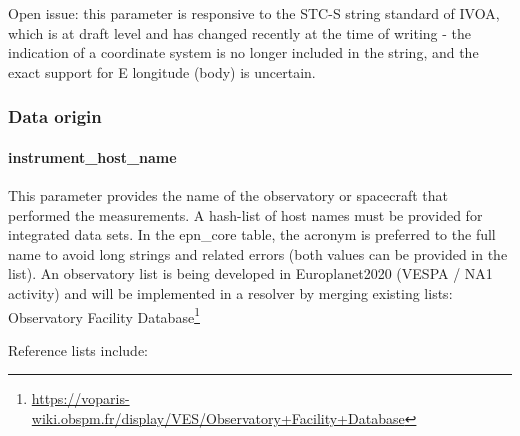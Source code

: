 \documentclass[11pt,a4paper]{ivoa}
\begin{document}
Open issue: this parameter is responsive to the STC-S string standard of IVOA, which is at draft level and has changed recently at the time of writing - the indication of a coordinate system is no longer included in the string, and the exact support for E longitude (body) is uncertain.

\subsubsection{Data origin}

\paragraph{instrument\_host\_name}

This parameter provides the name of the observatory or spacecraft that performed the measurements. A hash-list of host names must be provided for integrated data sets. In the epn\_core table, the acronym is preferred to the full name to avoid long strings and related errors (both values can be provided in the list). An observatory list is being developed in Europlanet2020 (VESPA / NA1 activity) and will be implemented in a resolver by merging existing lists: Observatory Facility Database\footnote{\url{https://voparis-wiki.obspm.fr/display/VES/Observatory+Facility+Database}}

Reference lists include:
\end{document}
